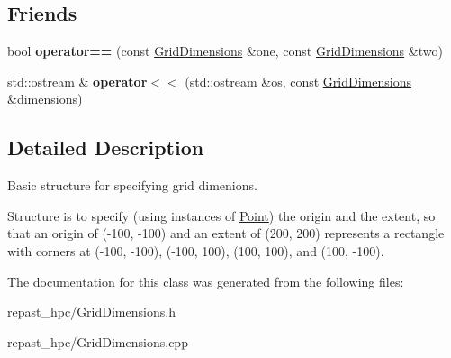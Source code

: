 \subsection*{Friends}
\begin{DoxyCompactItemize}
\item 
\hypertarget{classrepast_1_1_grid_dimensions_aba42531b113bed80dcac86aac0377225}{bool {\bfseries operator==} (const \hyperlink{classrepast_1_1_grid_dimensions}{Grid\-Dimensions} \&one, const \hyperlink{classrepast_1_1_grid_dimensions}{Grid\-Dimensions} \&two)}\label{classrepast_1_1_grid_dimensions_aba42531b113bed80dcac86aac0377225}

\item 
\hypertarget{classrepast_1_1_grid_dimensions_aca04c2784205aba66e1478fdfdbb24db}{std\-::ostream \& {\bfseries operator$<$$<$} (std\-::ostream \&os, const \hyperlink{classrepast_1_1_grid_dimensions}{Grid\-Dimensions} \&dimensions)}\label{classrepast_1_1_grid_dimensions_aca04c2784205aba66e1478fdfdbb24db}

\end{DoxyCompactItemize}


\subsection{Detailed Description}
Basic structure for specifying grid dimenions. 

Structure is to specify (using instances of \hyperlink{classrepast_1_1_point}{Point}) the origin and the extent, so that an origin of (-\/100, -\/100) and an extent of (200, 200) represents a rectangle with corners at (-\/100, -\/100), (-\/100, 100), (100, 100), and (100, -\/100). 

The documentation for this class was generated from the following files\-:\begin{DoxyCompactItemize}
\item 
repast\-\_\-hpc/Grid\-Dimensions.\-h\item 
repast\-\_\-hpc/Grid\-Dimensions.\-cpp\end{DoxyCompactItemize}
